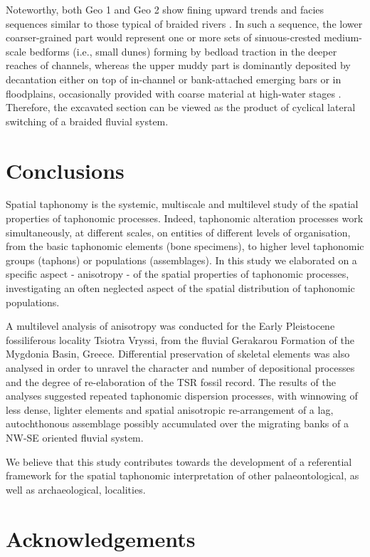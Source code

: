 \documentclass[review,times,authoryear]{elsarticle} %
\begin{document}
Noteworthy, both Geo 1 and Geo 2 show fining upward trends and facies sequences similar to those typical of braided rivers \citep{Miall1977}. In such a sequence, the lower coarser-grained part would represent one or more sets of sinuous-crested medium-scale bedforms (i.e., small dunes) forming by bedload traction in the deeper reaches of channels, whereas the upper muddy part is dominantly deposited by decantation either on top of in-channel or bank-attached emerging bars or in floodplains, occasionally provided with coarse material at high-water stages \citep{Miall1982}. Therefore, the excavated section can be viewed as the product of cyclical lateral switching of a braided fluvial system.

\section{Conclusions}

Spatial taphonomy is the systemic, multiscale and multilevel study of the spatial properties of taphonomic processes. Indeed, taphonomic alteration processes work simultaneously, at different scales, on entities of different levels of organisation, from the basic taphonomic elements (bone specimens), to higher level taphonomic groups (taphons) or populations (assemblages). In this study we elaborated on a specific aspect - anisotropy - of the spatial properties of taphonomic processes, investigating an often neglected aspect of the spatial distribution of taphonomic populations.

A multilevel analysis of anisotropy was conducted for the Early Pleistocene fossiliferous locality Tsiotra Vryssi, from the fluvial Gerakarou Formation of the Mygdonia Basin, Greece. Differential preservation of skeletal elements was also analysed in order to unravel the character and number of depositional processes and the degree of re-elaboration of the TSR fossil record. The results of the analyses suggested repeated taphonomic dispersion processes, with winnowing of less dense, lighter elements and spatial anisotropic re-arrangement of a lag, autochthonous assemblage possibly accumulated over the migrating banks of a NW-SE oriented fluvial system.

We believe that this study contributes towards the development of a referential framework for the spatial taphonomic interpretation of other palaeontological, as well as archaeological, localities.

\section*{Acknowledgements}
\end{document}
